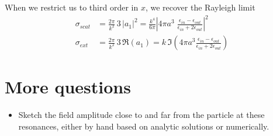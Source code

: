 When we restrict us to third order in $x$, we recover the Rayleigh limit
\begin{eqnarray}
\sigma_{scat} & = \frac{2 \pi }{k^2} \, 3 \, \left| a_1 \right|^2 
 = \frac{k^4}{6 \pi} \left| 4 \pi a^3  \; \frac{\epsilon_{in} - \epsilon_{out}}{\epsilon_{in} + 2 \epsilon_{out}} \right|^2 \\
\sigma_{ext} & = \frac{2 \pi }{k^2} \, 3 \, \Re \left( a_1 \right) 
= k \, \Im \left( 4 \pi a^3 \frac{\epsilon_{in} - \epsilon_{out}}{\epsilon_{in} + 2 \epsilon_{out}}  \right)
\end{eqnarray}


\section{More questions}

\begin{itemize}
\item Sketch the field amplitude close to and far from the particle at these resonances, either by hand based on analytic solutions or numerically.
\end{itemize}


\printbibliography[segment=\therefsegment,heading=subbibliography]
